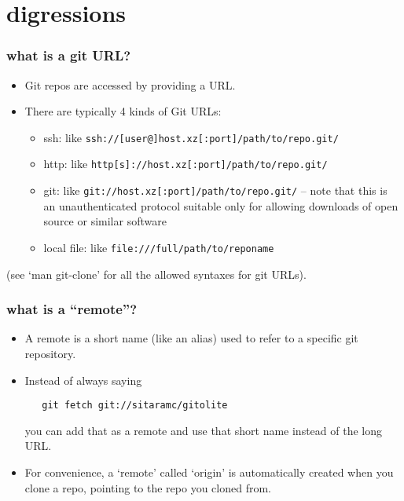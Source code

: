\documentclass[presentation]{beamer}
\begin{document}
\section{digressions}
\label{sec-5}
\begin{frame}
\frametitle{what is a git URL?}
\label{sec-5-1}



\begin{itemize}
\item Git repos are accessed by providing a URL.
\item There are typically 4 kinds of Git URLs:
\begin{itemize}
\item ssh: like \texttt{ssh://[user@]host.xz[:port]/path/to/repo.git/}
\item http: like \texttt{http[s]://host.xz[:port]/path/to/repo.git/}
\item git: like \texttt{git://host.xz[:port]/path/to/repo.git/} -- note that this is an
      unauthenticated protocol suitable only for allowing downloads of open
      source or similar software
\item local file: like \texttt{file:///full/path/to/reponame}
\end{itemize}
\end{itemize}

(see `man git-clone' for all the allowed syntaxes for git URLs).
\end{frame}
\begin{frame}[fragile]
\frametitle{what is a ``remote''?}
\label{sec-5-2}


\begin{itemize}
\item A remote is a short name (like an alias) used to refer to a specific git
  repository.
\item Instead of always saying 
\begin{verbatim}
   git fetch git://sitaramc/gitolite
\end{verbatim}

  you can add that as a remote and use that short name instead of the
  long URL.
\item For convenience, a `remote' called `origin' is automatically created
  when you clone a repo, pointing to the repo you cloned from.
\end{itemize}
\end{frame}
\end{document}
